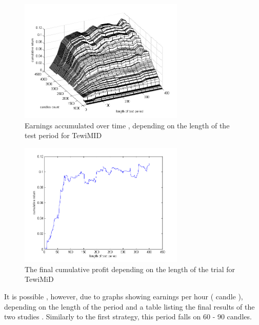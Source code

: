\documentclass{tewiart}
\begin{document}
\begin{figure}[h!]
\begin{center}
\includegraphics[width=0.7\textwidth]{pictures/cumulativeReturnsD.png}
\caption{Earnings accumulated over time , depending on the length of the test period for TewiMID}
\label{Cum3DMiD}
\end{center}
\end{figure}
\FloatBarrier

\begin{figure}[h!]
\begin{center}
\includegraphics[width=0.7\textwidth]{pictures/mid_end.png}
\caption{The final cumulative profit depending on the length of the trial for TewiMiD}
\label{Cum3DMiDend}
\end{center}
\end{figure}
\FloatBarrier

It is possible , however, due to graphs showing earnings per hour ( candle ), depending on the length of the period and a table listing the final results of the two studies . Similarly to the first strategy, this period falls on 60 - 90 candles.
\end{document}

